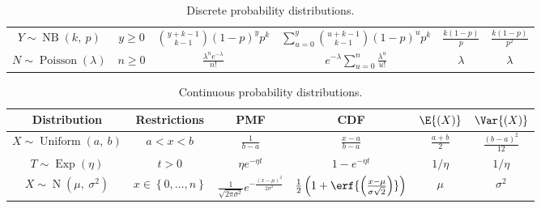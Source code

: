 \documentclass{article}
\begin{document}
\begin{table}[H]
\begin{tabular}{c c c c c c}
        \( Y \sim \operatorname{NB}{\left( k,\: p \right)}\)       & \(y \geq 0\)                                           & \(\binom{y + k - 1}{k - 1} \left( 1 - p \right)^y p^k\)   & \(\sum_{u = 0}^y \binom{u + k - 1}{k - 1} \left( 1 - p \right)^u p^k\)   & \(\frac{k\left( 1 - p \right)}{p}\) & \(\frac{k\left( 1 - p \right)}{p^2}\)         \\
        \( N \sim \operatorname{Poisson}{\left( \lambda \right)}\) & \(n \geq 0\)                                           & \(\frac{\lambda^n e^{-\lambda}}{n!}\)                     & \(e^{-\lambda} \sum_{u = 0}^n \frac{\lambda^u}{u!}\)                     & \(\lambda\)                         & \(\lambda\)                                   \\
        \bottomrule
    \end{tabular}
    \caption{Discrete probability distributions.} %
\end{table}
\begin{table}[H]
    \centering
    \begin{tabular}{c c c c c c}
        \toprule
        \textbf{Distribution}                                       & \textbf{Restrictions}                  & \textbf{PMF}                                                                         & \textbf{CDF}                                                                            & \(\E{\left( X \right)}\) & \(\Var{\left( X \right)}\)            \\
        \midrule
        \(X \sim \operatorname{Uniform}{\left( a,\: b \right)}\)    & \(a < x < b\)                          & \(\frac{1}{b - a}\)                                                                  & \(\frac{x - a}{b - a}\)                                                                 & \(\frac{a + b}{2}\)      & \(\frac{\left( b - a \right)^2}{12}\) \\
        \(T \sim \operatorname{Exp}{\left( \eta \right)}\)          & \(t > 0\)                              & \(\eta e^{-\eta t}\)                                                                 & \(1 - e^{-\eta t}\)                                                                     & \(1/\eta\)               & \(1/\eta\)                            \\
        \(X \sim \operatorname{N}{\left( \mu,\: \sigma^2 \right)}\) & \(x \in \left\{ 0, \dots, n \right\}\) & \(\frac{1}{\sqrt{2 \pi \sigma^2}} e^{-\frac{\left( x - \mu \right)^2}{2 \sigma^2}}\) & \(\frac{1}{2} \left( 1 + \erf{\left( \frac{x - \mu}{\sigma \sqrt{2}} \right)} \right)\) & \(\mu\)                  & \(\sigma^2\)                          \\
        \bottomrule
    \end{tabular}
    \caption{Continuous probability distributions.} %
\end{table}
\end{document}
